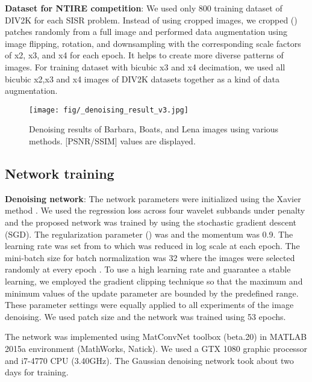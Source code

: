\documentclass[10pt,twocolumn,letterpaper]{article}
\begin{document}
{\bf Dataset for NTIRE competition}: We used only 800 training dataset of DIV2K for each SISR problem. Instead of using cropped images, we cropped () patches randomly from a full image and performed data augmentation using image flipping, rotation, and downsampling with the corresponding scale factors of x2, x3, and x4 for each epoch. It helps to create more diverse patterns of images. For training dataset with bicubic x3 and x4 decimation, we used all bicubic x2,x3 and x4 images of DIV2K datasets together as a kind of data augmentation.

\begin{figure*}[!hbt]
\centerline{\texttt{[image: fig/\_denoising\_result\_v3.jpg]}}
\caption{Denoising results of Barbara, Boats, and Lena images using various methods. [PSNR/SSIM] values are displayed.}
\label{fig:proposed_denoised_compareIMG}
\end{figure*}



\subsection{Network training}
{\bf Denoising network}:
The network parameters were initialized using the Xavier method \cite{he2015delving}. We used the regression loss across four wavelet subbands under  penalty and the proposed network was trained by using the stochastic gradient descent (SGD). The regularization parameter () was  and the momentum was 0.9. The learning rate was set from  to  which was reduced in log scale at each epoch. The mini-batch size for batch normalization was 32 where the images were selected randomly at every epoch \cite{ioffe2015batch}.
To use a high learning rate and guarantee a stable learning, we employed the gradient clipping technique \cite{kim2015accurate} so that the maximum and minimum values of the update parameter are bounded by the predefined range. These parameter settings were equally applied to all experiments of the image denoising. We used  patch size and the network was trained using 53 epochs.



The network was implemented using MatConvNet toolbox (beta.20) \cite{vedaldi2015matconvnet} in MATLAB 2015a environment (MathWorks, Natick). We used a GTX 1080 graphic processor and i7-4770 CPU (3.40GHz). The Gaussian denoising network took about two days for training.
\end{document}
